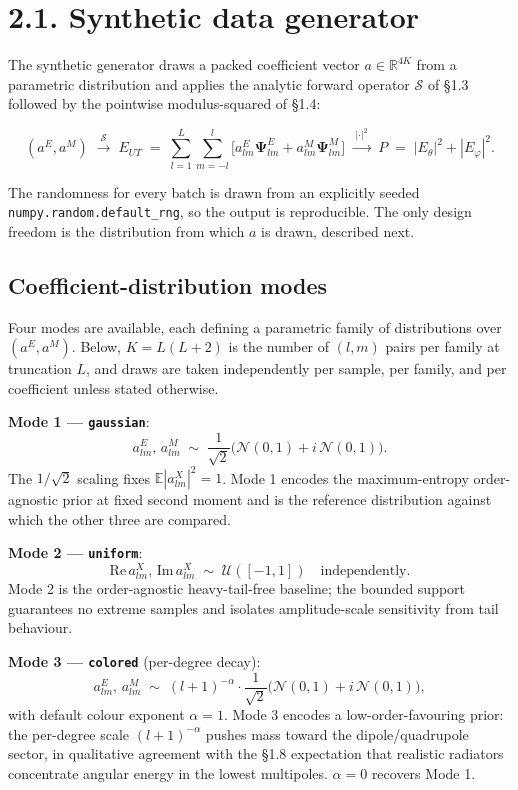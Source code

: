 \documentclass[
  english,
  11pt,
]{report}
\begin{document}
\section{2.1. Synthetic data generator}\label{synthetic-data-generator}

The synthetic generator draws a packed coefficient vector
\(a \in \mathbb{R}^{4K}\) from a parametric distribution and applies the
analytic forward operator \(\mathcal S\) of §1.3 followed by the
pointwise modulus-squared of §1.4:

\[
(a^E, a^M)\;\xrightarrow{\;\mathcal S\;}\;E_{UT}\;=\;\sum_{l=1}^{L}\sum_{m=-l}^{l}\bigl[a^E_{lm}\boldsymbol{\Psi}^E_{lm} + a^M_{lm}\boldsymbol{\Psi}^M_{lm}\bigr]\;\xrightarrow{\;|\cdot|^2\;}\;P\;=\;|E_\theta|^2+|E_\varphi|^2.
\]

The randomness for every batch is drawn from an explicitly seeded
\texttt{numpy.random.default\_rng}, so the output is reproducible. The
only design freedom is the distribution from which \(a\) is drawn,
described next.

\subsection{Coefficient-distribution
modes}\label{coefficient-distribution-modes}

Four modes are available, each defining a parametric family of
distributions over \((a^E, a^M)\). Below, \(K = L(L+2)\) is the number
of \((l,m)\) pairs per family at truncation \(L\), and draws are taken
independently per sample, per family, and per coefficient unless stated
otherwise.

\textbf{Mode 1 --- \texttt{gaussian}}: \[
a^E_{lm},\, a^M_{lm}\;\sim\;\frac{1}{\sqrt 2}\bigl(\mathcal N(0,1) + i\,\mathcal N(0,1)\bigr).
\] The \(1/\sqrt 2\) scaling fixes \(\mathbb E|a^X_{lm}|^2 = 1\). Mode 1
encodes the maximum-entropy order-agnostic prior at fixed second moment
and is the reference distribution against which the other three are
compared.

\textbf{Mode 2 --- \texttt{uniform}}: \[
\mathrm{Re}\,a^X_{lm},\, \mathrm{Im}\,a^X_{lm}\;\sim\;\mathcal U([-1, 1])\quad\text{independently}.
\] Mode 2 is the order-agnostic heavy-tail-free baseline; the bounded
support guarantees no extreme samples and isolates amplitude-scale
sensitivity from tail behaviour.

\textbf{Mode 3 --- \texttt{colored}} (per-degree decay): \[
a^E_{lm},\, a^M_{lm}\;\sim\;(l+1)^{-\alpha}\cdot\frac{1}{\sqrt 2}\bigl(\mathcal N(0,1) + i\,\mathcal N(0,1)\bigr),
\] with default colour exponent \(\alpha = 1\). Mode 3 encodes a
low-order-favouring prior: the per-degree scale \((l+1)^{-\alpha}\)
pushes mass toward the dipole/quadrupole sector, in qualitative
agreement with the §1.8 expectation that realistic radiators concentrate
angular energy in the lowest multipoles. \(\alpha = 0\) recovers Mode 1.
\end{document}

